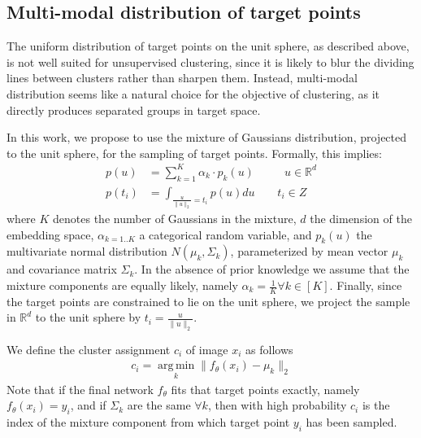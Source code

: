 \documentclass[a4paper,conference]{IEEEtran}
\DeclareMathOperator*{\argmin}{arg\,min}
\begin{document}
\subsection{Multi-modal distribution of target points}

The uniform distribution of target points on the unit sphere, as described above, is not well suited for unsupervised clustering, since it is likely to blur the dividing lines between clusters rather than sharpen them. Instead,  multi-modal distribution seems like a natural choice for the objective of clustering, as it directly produces separated groups in target space. 

In this work, we propose to use the mixture of Gaussians distribution, projected to the unit sphere, for the sampling of target points. Formally, this implies:
\begin{equation}
\begin{split}
\label{eq:def-gmm}
p (u) &= \sum^{K}_{k=1} \alpha_k \cdot p_k (u) ~~~~~~~~~~~~u\in {\mathbb R}^d \\
p (t_i) &= \int_{\frac{u}{\|u\|_2}=t_i} p (u)du ~~~~~~~~~t_i\in Z
\end{split}
\end{equation}
where $K$ denotes the number of Gaussians in the mixture, $d$ the dimension of the embedding space, $\alpha_{k=1..K}$  a categorical random variable, and $p_k(u)$  the multivariate normal distribution $N(\mu_k,\Sigma_k)$, parameterized by mean vector $\mu_k$ and covariance matrix $\Sigma_k$. In the absence of prior knowledge we assume that the mixture components are equally likely, namely $\alpha_k=\frac{1}{K}\forall k\in [K]$. Finally, since the target points are constrained to lie on the unit sphere, we project the sample in $\mathbb{R}^d$ to the unit sphere by $t_i=\frac{u}{\|u\|_2}$. 

We define the cluster assignment $c_i$ of image $x_i$ as follows
\begin{align}\label{eq:2}
c_i = \argmin\limits_k \|f_\theta(x_i)-\mu_k \|_2
\end{align}
Note that if the final network $f_\theta$ fits that target points exactly, namely $f_\theta(x_i)=y_i$, and if $\Sigma_k$ are the same $\forall k$, then with high probability $c_i$ is the index of the mixture component from which target point $y_i$ has been sampled.
\end{document}
